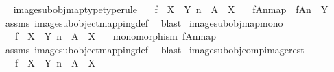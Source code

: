 \begin{isabellebody}
%
\isadelimproof
\ \isanewline
%
\endisadelimproof
\isanewline
{}\isamarkupfalse%
\ image{\isacharunderscore}{\kern0pt}subobj{\isacharunderscore}{\kern0pt}map{\isacharunderscore}{\kern0pt}type{\isacharbrackleft}{\kern0pt}type{\isacharunderscore}{\kern0pt}rule{\isacharbrackright}{\kern0pt}{\isacharcolon}{\kern0pt}\isanewline
\ \ \ {\isachardoublequoteopen}f\ {\isacharcolon}{\kern0pt}\ X\ {\isasymrightarrow}\ Y{\isachardoublequoteclose}\ {\isachardoublequoteopen}n\ {\isacharcolon}{\kern0pt}\ A\ {\isasymrightarrow}\ X{\isachardoublequoteclose}\isanewline
\ \ \ {\isachardoublequoteopen}{\isacharbrackleft}{\kern0pt}f{\isasymlparr}A{\isasymrparr}\isactrlbsub n\isactrlesub {\isacharbrackright}{\kern0pt}map\ {\isacharcolon}{\kern0pt}\ f{\isasymlparr}A{\isasymrparr}\isactrlbsub n\isactrlesub \ {\isasymrightarrow}\ Y{\isachardoublequoteclose}\isanewline
%
\isadelimproof
\ \ %
\endisadelimproof
%
\isatagproof
{}\isamarkupfalse%
\ assms\ image{\isacharunderscore}{\kern0pt}subobject{\isacharunderscore}{\kern0pt}mapping{\isacharunderscore}{\kern0pt}def{}\ \isamarkupfalse%
\ blast%
\endisatagproof
{\isafoldproof}%
%
\isadelimproof
\isanewline
%
\endisadelimproof
\isanewline
{}\isamarkupfalse%
\ image{\isacharunderscore}{\kern0pt}subobj{\isacharunderscore}{\kern0pt}map{\isacharunderscore}{\kern0pt}mono{\isacharcolon}{\kern0pt}\isanewline
\ \ \ {\isachardoublequoteopen}f\ {\isacharcolon}{\kern0pt}\ X\ {\isasymrightarrow}\ Y{\isachardoublequoteclose}\ {\isachardoublequoteopen}n\ {\isacharcolon}{\kern0pt}\ A\ {\isasymrightarrow}\ X{\isachardoublequoteclose}\isanewline
\ \ \ {\isachardoublequoteopen}monomorphism\ {\isacharparenleft}{\kern0pt}{\isacharbrackleft}{\kern0pt}f{\isasymlparr}A{\isasymrparr}\isactrlbsub n\isactrlesub {\isacharbrackright}{\kern0pt}map{\isacharparenright}{\kern0pt}{\isachardoublequoteclose}\isanewline
%
\isadelimproof
\ \ %
\endisadelimproof
%
\isatagproof
{}\isamarkupfalse%
\ assms\ image{\isacharunderscore}{\kern0pt}subobject{\isacharunderscore}{\kern0pt}mapping{\isacharunderscore}{\kern0pt}def{}\ \isamarkupfalse%
\ blast%
\endisatagproof
{\isafoldproof}%
%
\isadelimproof
\isanewline
%
\endisadelimproof
\isanewline
{}\isamarkupfalse%
\ image{\isacharunderscore}{\kern0pt}subobj{\isacharunderscore}{\kern0pt}comp{\isacharunderscore}{\kern0pt}image{\isacharunderscore}{\kern0pt}rest{\isacharcolon}{\kern0pt}\isanewline
\ \ \ {\isachardoublequoteopen}f\ {\isacharcolon}{\kern0pt}\ X\ {\isasymrightarrow}\ Y{\isachardoublequoteclose}\ {\isachardoublequoteopen}n\ {\isacharcolon}{\kern0pt}\ A\ {\isasymrightarrow}\ X{\isachardoublequoteclose}\isanewline

\end{isabellebody}
